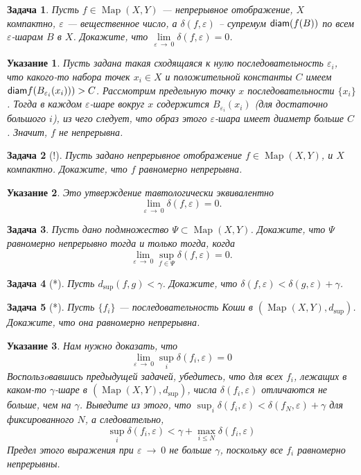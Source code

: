 \documentclass[12pt]{book}
\newcommand{\arrow}{{\:\longrightarrow\:}}
\renewcommand{\epsilon}{\varepsilon}
\def\Map{\operatorname{Map}}
\newcommand{\diam}{{\sf diam}}
\theoremstyle{upshape}
\newtheorem{zadacha}{Задача}[chapter]
\theoremstyle{generic}
\theoremstyle{upshapenonumber}
\newtheorem{ukazanie}{Указание}[section]
\newcommand{\следствие}{%
     \refstepcounter{teorema}
     {\noindent\bf Следствие \thechapter.\arabic{teorema}:\ }}
\newcommand{\пример}{%
     \refstepcounter{teorema}
     {\noindent\bf Пример \thechapter.\arabic{teorema}:\ }}
\newcommand{\лемма}{%
     \refstepcounter{teorema}
     {\noindent\bf Лемма \thechapter.\arabic{teorema}:\ }}
\newcommand{\теорема}{%
     \refstepcounter{teorema}
     {\noindent\bf Теорема \thechapter.\arabic{teorema}:\ }}
\newcommand{\утверждение}{%
     \refstepcounter{teorema}
     {\noindent\bf Утверждение \thechapter.\arabic{teorema}:\ }}
\begin{document}
{\begin{zadacha} 
Пусть $f \in \Map(X,Y)$ --- непрерывное отображение, $X$ компактно,
$\epsilon$ --- вещественное число, а $\delta(f, \epsilon)$ --
супремум $\diam(f(B))$
по всем $\epsilon$-шарам $B$ в $X$.
Докажите, что $\lim\limits_{\epsilon \arrow 0}\delta(f, \epsilon)=0$.
\end{zadacha}

\begin{ukazanie} 
Пусть задана такая сходящаяся к нулю последовательность
$\epsilon_i$, что какого-то набора точек $x_i\in X$ и
положительной константы $C$ имеем $\diam
f(B_{\epsilon_i}(x_i)))>C$. Рассмотрим предельную точку $x$ 
последовательности $\{x_i\}$. Тогда
в каждом $\epsilon$-шаре вокруг $x$ содержится
$B_{\epsilon_i}(x_i)$ (для достаточно большого $i$),
из чего следует, что образ этого $\epsilon$-шара
имеет диаметр больше $C$. Значит, $f$ не непрерывна.
\end{ukazanie}

\begin{zadacha}[!]
Пусть задано непрерывное отображение $f \in \Map(X,Y)$, и $X$ компактно.
Докажите, что $f$ равномерно непрерывна.
\end{zadacha}

\begin{ukazanie}
Это утверждение тавтологически эквивалентно
\[ \lim\limits_{\epsilon \arrow 0}\delta(f, \epsilon)=0.\]
\end{ukazanie}

\begin{zadacha} 
Пусть дано подмножество $\Psi \subset\Map(X,Y)$.
Докажите, что $\Psi$ равномерно непрерывно
тогда и только тогда, когда 
\[ \lim\limits_{\epsilon\arrow 0}\sup_{f\in\Psi}\delta(f, \epsilon)=0.\]
\end{zadacha}

\begin{zadacha}[*]
Пусть $d_{\sup}(f,g) <\gamma$. Докажите, что
$\delta(f, \epsilon)< \delta(g, \epsilon)+\gamma$.
\end{zadacha}

\begin{zadacha}[*]
Пусть $\{f_i\}$ --- последовательность Коши в $(\Map(X,Y),d_{\sup})$.
Докажите, что она равномерно непрерывна.
\end{zadacha}

\begin{ukazanie}
Нам нужно доказать, что 
\[
\lim\limits_{\epsilon\arrow 0}\sup_{i}\delta(f_i,\epsilon)=0
\]
Воспользoвавшись предыдущей задачей, убедитесь,
что для всех $f_i$, лежащих в каком-то $\gamma$-шаре 
в $(\Map(X,Y),d_{\sup})$, числа $\delta(f_i, \epsilon)$
отличаются не больше, чем на $\gamma$. Выведите из этого,
что $\sup_{i}\delta(f_i,\epsilon) <\delta(f_N,\epsilon)+\gamma$
для фиксированного $N$, а следовательно,
\[
\sup_{i}\delta(f_i,\epsilon)< \gamma + \max_{i\leq N}\delta(f_i,\epsilon)
\]
Предел этого выражения при $\epsilon \arrow 0$ не
больше $\gamma$, поскольку все $f_i$ равномерно непрерывны. 
\end{ukazanie}

}
\end{document}
